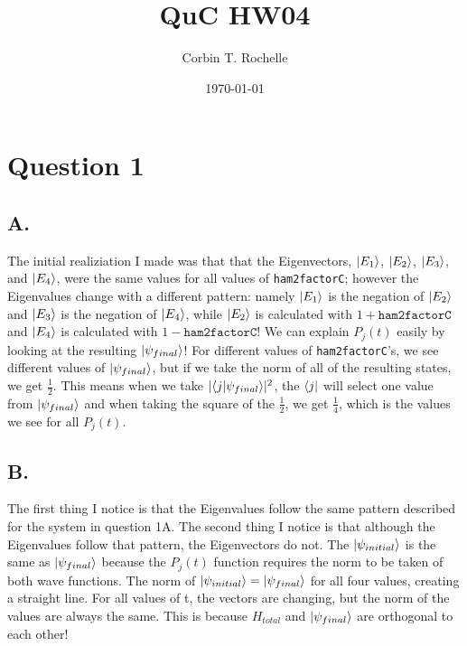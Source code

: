 \documentclass[12pt]{article}
\author{Corbin T. Rochelle}
\title{QuC HW04}
\date{\today}
\begin{document}
\maketitle

\section*{Question 1}
\subsection*{A.}
The initial realiziation I made was that that the Eigenvectors, $\ket{E_1}$, $\ket{E_2}$, $\ket{E_3}$, and $\ket{E_4}$, were the same values for all values of \texttt{ham2factorC};
however the Eigenvalues change with a different pattern: namely $\ket{E_1}$ is the negation of $\ket{E_2}$ and $\ket{E_3}$ is the negation of $\ket{E_4}$, while $\ket{E_2}$ is calculated with $1+\texttt{ham2factorC}$ and $\ket{E_4}$ is calculated with $1-\texttt{ham2factorC}$!
We can explain $P_j(t)$ easily by looking at the resulting $\ket{\psi_{final}}$!
For different values of \texttt{ham2factorC}'s, we see different values of $\ket{\psi_{final}}$, but if we take the norm of all of the resulting states, we get $\frac{1}{2}$. 
This means when we take $\lvert\bra{j}\ket{\psi_{final}}\rvert^2$, the $\bra{j}$ will select one value from $\ket{\psi_{final}}$ and when taking the square of the $\frac{1}{2}$, we get $\frac{1}{4}$, which is the values we see for all $P_j(t)$.

\subsection*{B.}
The first thing I notice is that the Eigenvalues follow the same pattern described for the system in question 1A. 
The second thing I notice is that although the Eigenvalues follow that pattern, the Eigenvectors do not. 
The $\ket{\psi_{initial}}$ is the same as $\ket{\psi_{final}}$ because the $P_j(t)$ function requires the norm to be taken of both wave functions. 
The norm of $\ket{\psi_{initial}}=\ket{\psi_{final}}$ for all four values, creating a straight line.
For all values of t, the vectors are changing, but the norm of the values are always the same. 
This is because $H_{total}$ and $\ket{\psi_{final}}$ are orthogonal to each other! 
\end{document}
